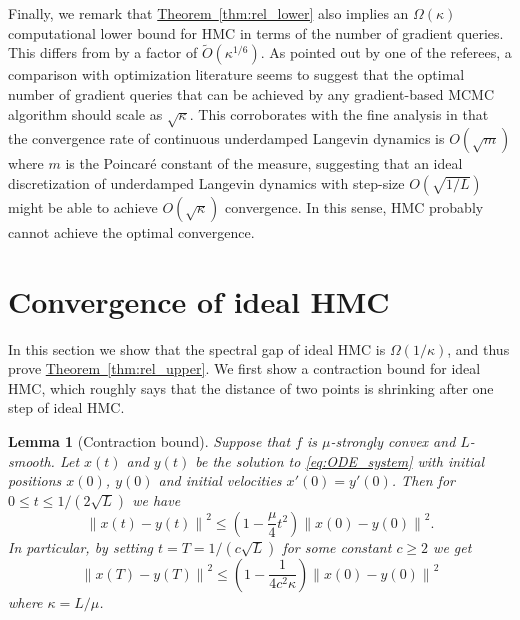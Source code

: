 \documentclass[11pt]{article}
\numberwithin{equation}{section}
\newtheorem{lemma}[theorem]{Lemma}
\theoremstyle{definition}
\theoremstyle{plain}
\newcommand{\expref}[2]{\hyperref[#2]{#1~\ref{#2}}}
\newcommand{\norm}[1]{\left\lVert #1 \right\rVert}
\begin{document}
Finally, we remark that \expref{Theorem}{thm:rel_lower} also implies an $\Omega(\kappa)$ computational lower bound for HMC in terms of the number of gradient queries. 
This differs from \cite{SL19} by a factor of $\tilde{O}(\kappa^{1/6})$. 
As pointed out by one of the referees, 
a comparison with optimization literature seems to suggest that the optimal number of gradient queries that can be achieved by any gradient-based MCMC algorithm should scale as $\sqrt{\kappa}$. 
This corroborates with the fine analysis in \cite{CLW19} that the convergence rate of continuous underdamped Langevin dynamics is $O(\sqrt{m})$ where $m$ is the Poincar\'{e} constant of the measure, 
suggesting that an ideal discretization of underdamped Langevin dynamics with step-size $O(\sqrt{1/L})$ might be able to achieve $O(\sqrt{\kappa})$ convergence. 
In this sense, HMC probably cannot achieve the optimal convergence.



\section{Convergence of ideal HMC}
In this section we show that the spectral gap of ideal HMC is $\Omega(1/\kappa)$, and thus prove \expref{Theorem}{thm:rel_upper}. 
We first show a contraction bound for ideal HMC, which roughly says that the distance of two points is shrinking after one step of ideal HMC. 

\begin{lemma}[Contraction bound]
	\label{lem:HMC_contraction}
	Suppose that $f$ is $\mu$-strongly convex and $L$-smooth. Let $x(t)$ and $y(t)$ be the solution to \eqref{eq:ODE_system} with initial positions $x(0)$, $y(0)$ and initial velocities $x'(0) = y'(0)$. Then for $0\le t \le 1/(2\sqrt{L})$ we have
	\begin{equation}
	\norm{x(t) - y(t)}^2 \le \left( 1 - \frac{\mu}{4} t^2 \right) \norm{x(0) - y(0)}^2.
	\end{equation}
	In particular, by setting $t = T = 1/(c\sqrt{L})$ for some constant $c \ge 2$ we get
	\begin{equation}
	\norm{x(T) - y(T)}^2 \le \left( 1 - \frac{1}{4c^2 \kappa} \right) \norm{x(0) - y(0)}^2
	\end{equation}
	where $\kappa = L/\mu$.
\end{lemma}
\end{document}
